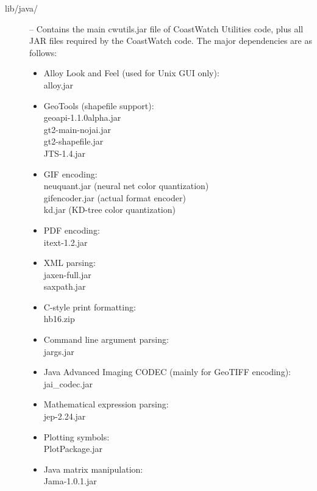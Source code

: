 {\begin{description}
\item[{\file lib/java/}] -- Contains the main {\file cwutils.jar} file of
CoastWatch Utilities code, plus all JAR files required by the
CoastWatch code.  The major dependencies are as follows:
\begin{itemize}

\item Alloy Look and Feel (used for Unix GUI only):\\
{\file alloy.jar}

\item GeoTools (shapefile support):\\
{\file geoapi-1.1.0alpha.jar}\\
{\file gt2-main-nojai.jar}\\
{\file gt2-shapefile.jar}\\
{\file JTS-1.4.jar}

\item GIF encoding: \\
{\file neuquant.jar} (neural net color quantization) \\
{\file gifencoder.jar} (actual format encoder) \\
{\file kd.jar} (KD-tree color quantization)

\item PDF encoding: \\
{\file itext-1.2.jar}

\item XML parsing: \\
{\file jaxen-full.jar} \\
{\file saxpath.jar}

\item C-style print formatting:\\
{\file hb16.zip}

\item Command line argument parsing:\\
{\file jargs.jar}

\item Java Advanced Imaging CODEC (mainly for GeoTIFF encoding):\\
{\file jai\_codec.jar}

\item Mathematical expression parsing:\\
{\file jep-2.24.jar}

\item Plotting symbols:\\
{\file PlotPackage.jar}

\item Java matrix manipulation:\\
{\file Jama-1.0.1.jar}


\end{itemize}
\end{description}}
